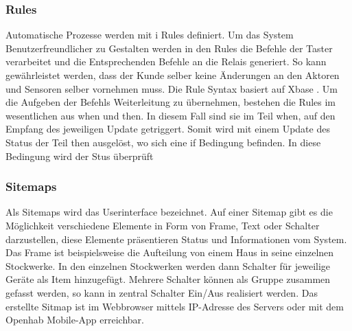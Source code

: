 \subsubsection{Rules} 
Automatische Prozesse werden mit i Rules definiert. Um das System Benutzerfreundlicher zu Gestalten werden in den Rules die Befehle der Taster verarbeitet und die Entsprechenden Befehle an die Relais generiert. So kann gewährleistet werden, dass der Kunde selber keine Änderungen an den Aktoren und Sensoren selber vornehmen muss. Die Rule Syntax basiert auf Xbase \cite{noauthor_xtext_nodate}. Um die Aufgeben der Befehls Weiterleitung zu übernehmen, bestehen die Rules im wesentlichen aus when und then. In diesem Fall sind sie im Teil when, auf den Empfang des jeweiligen Update getriggert. Somit wird mit einem Update des Status der Teil then ausgelöst, wo sich eine if Bedingung befinden. In diese Bedingung wird der Stus überprüft      

\subsubsection{Sitemaps} 
Als Sitemaps wird das Userinterface bezeichnet. Auf einer Sitemap  gibt es die Möglichkeit verschiedene Elemente in Form von Frame, Text oder Schalter darzustellen, diese Elemente präsentieren Status und Informationen vom System. Das Frame ist beispielsweise die Aufteilung von einem Haus in seine einzelnen Stockwerke. In den einzelnen Stockwerken werden dann Schalter für jeweilige Geräte als Item hinzugefügt. Mehrere Schalter können als Gruppe zusammen gefasst werden, so kann in zentral Schalter Ein/Aus realisiert werden. Das erstellte Sitmap ist im Webbrowser mittels IP-Adresse des Servers oder mit dem Openhab Mobile-App erreichbar.

